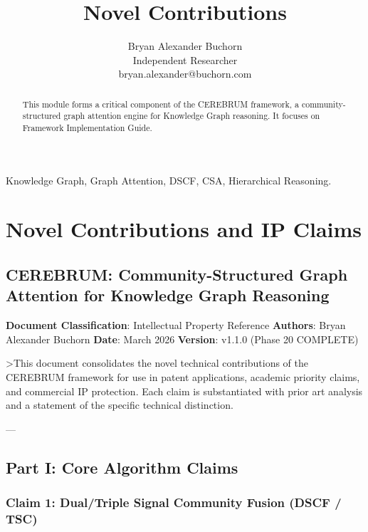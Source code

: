 \documentclass[10pt,journal,compsoc]{IEEEtran}
\begin{document}
\title{Novel Contributions}
\author{Bryan Alexander Buchorn \\ Independent Researcher \\ bryan.alexander@buchorn.com}

\maketitle

\begin{abstract}
This module forms a critical component of the CEREBRUM framework, a community-structured graph attention engine for Knowledge Graph reasoning. It focuses on Framework Implementation Guide.
\end{abstract}

\begin{IEEEkeywords}
Knowledge Graph, Graph Attention, DSCF, CSA, Hierarchical Reasoning.
\end{IEEEkeywords}

\section{Novel Contri\-butions and IP Claims}

\subsection{CEREBRUM: Community-Structured Graph Attention for Knowledge Graph Reasoning}

\textbf{Document Classi\-fication}: Intell\-ectual Property Reference
\textbf{Authors}: Bryan Alexander Buchorn
\textbf{Date}: March 2026
\textbf{Version}: v1.1.0 (Phase 20 COMPLETE)

\textgreater  This document conso\-lidates the novel technical contr\-ibutions of the CEREBRUM framework for use in patent appli\-cations, academic priority claims, and commercial IP protection. Each claim is subst\-antiated with prior art analysis and a statement of the specific technical distinction.

---

\subsection{Part I: Core Algorithm Claims}

\subsubsection{Claim 1: Dual/Triple Signal Community Fusion (DSCF / TSC)}
\end{document}
